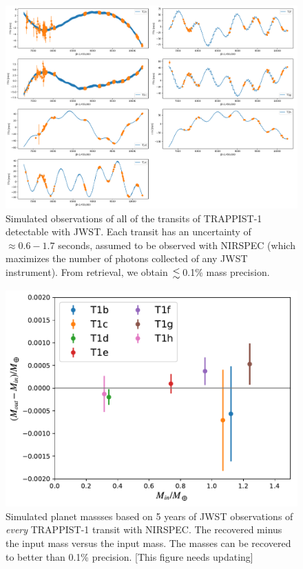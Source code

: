 \documentclass[fleqn,usenatbib]{mnras} %
\begin{document}
\begin{figure}
    \centering
    \includegraphics[width=\hsize]{figures/T1_JWST_all_transits_tight.png}
    \caption{Simulated observations of all of the transits of TRAPPIST-1
    detectable with JWST.  Each transit has an
    uncertainty of ${\approx} 0.6-1.7   $ seconds, assumed to be observed with
    NIRSPEC (which maximizes the number of photons collected of any JWST
    instrument).  From retrieval, we obtain
    ${\la}$0.1\% mass precision.}
    \label{fig:JWST_all_the_transits}
\end{figure}

\begin{figure}
    \centering
    \includegraphics[width=\hsize]{figures/Recovered_masses_JWST_5yr_all_transits_NIRSPEC.pdf}
    \caption{Simulated planet massses based on 5 years of JWST observations
    of \emph{every} TRAPPIST-1 transit with NIRSPEC.  The recovered minus
    the input mass versus the input mass.  The masses can be recovered to
    better than 0.1\% precision. [This figure needs updating]}
    \label{fig:JWST_all_mass}
\end{figure}
\end{document}
